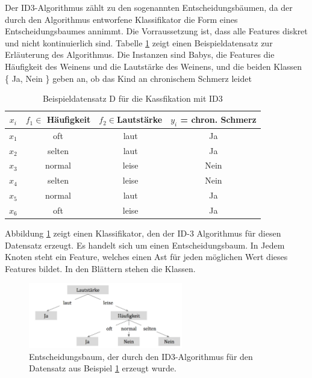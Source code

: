 Der ID3-Algorithmus zählt zu den sogenannten Entscheidungsbäumen, da der durch den Algorithmus entworfene Klassifikator die Form eines Entscheidungsbaumes annimmt. Die Vorraussetzung ist, dass alle Features diskret und nicht kontinuierlich sind. Tabelle \ref{tab:id3_example} zeigt einen Beispieldatensatz zur Erläuterung des Algorithmus. Die Instanzen sind Babys, die Features die \glqq Häufigkeit des Weinens\grqq{} und die \glqq Lautstärke des Weinens\grqq{}, und die beiden Klassen \{ Ja, Nein \} geben an, ob das Kind an chronischem Schmerz leidet

\begin{table}[h]
	\centering
	\caption{Beispieldatensatz D für die Kassfikation mit ID3}
	\label{tab:id3_example}
	\begin{tabular}{cccc}
		\toprule
		$x_i$    & $f_1 \in $ Häufigkeit   & $f_2 \in $Lautstärke & $y_i$ = chron. Schmerz \\\midrule
		$x_1$  & oft                & laut          & Ja           \\
		$x_2$  & selten                & laut          & Ja           \\
		$x_3$  & normal                & leise          & Nein         \\
		$x_4$  & selten                & leise          & Nein           \\
		$x_5$  & normal                & laut         & Ja       \\
		$x_6$  & oft                & leise          & Ja       \\ \bottomrule  
	\end{tabular}
\end{table}

Abbildung \ref{img:id3tree} zeigt einen Klassifikator, den der ID-3 Algorithmus für diesen Datensatz erzeugt. Es handelt sich um einen Entscheidungsbaum. In Jedem Knoten steht ein Feature, welches einen Ast für jeden möglichen Wert dieses Features bildet. In den Blättern stehen die Klassen.\cite[S. 134]{machine_marsland}

\begin{figure}[h]
	\centering
	\includegraphics[width=0.6\textwidth]{bilder/id3tree02.png}
	\caption{Entscheidungsbaum, der durch den ID3-Algorithmus für den Datensatz aus Beispiel \ref{tab:id3_example} erzeugt wurde.}
	\label{img:id3tree}
\end{figure}

